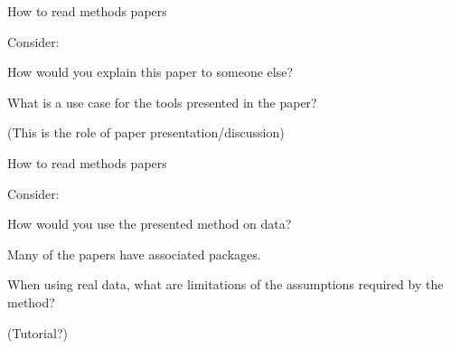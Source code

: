 \documentclass[xcolor={dvipsnames}, handout]{beamer}
\begin{document}

\begin{frame}{How to read methods papers}

Consider:\pause
\begin{wideitemize}
\item How would you explain this paper to someone else? \pause
\item What is a use case for the tools presented in the paper? \pause
\item (This is the role of paper presentation/discussion)
\end{wideitemize}

\end{frame}



\begin{frame}{How to read methods papers}

Consider:\pause
\begin{wideitemize}
\item How would you use the presented method on data? \pause
\begin{wideitemize}
\item Many of the papers have associated packages. \pause
\end{wideitemize}
\item When using real data, what are limitations of the assumptions required by the method?\pause
\item (Tutorial?)
\end{wideitemize}

\end{frame}


\end{document}
